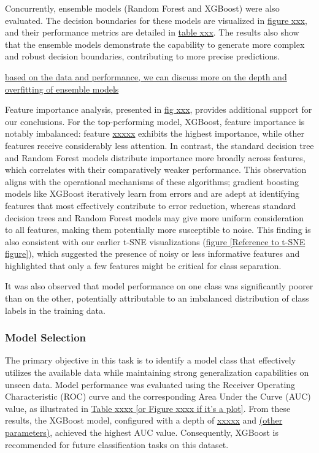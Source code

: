 \documentclass{article}
\begin{document}


Concurrently, ensemble models (Random Forest and XGBoost) were also evaluated. The decision boundaries for these models are visualized in \underline{figure xxx}, and their performance metrics are detailed in \underline{table xxx}. The results also show that the ensemble models demonstrate the capability to generate more complex and robust decision boundaries, contributing to more precise predictions. 

\underline{based on the data and performance, we can discuss more on the depth and overfitting of ensemble models}



Feature importance analysis, presented in \underline{fig xxx}, provides additional support for our conclusions. For the top-performing model, XGBoost, feature importance is notably imbalanced: feature \underline{xxxxx} exhibits the highest importance, while other features receive considerably less attention. In contrast, the standard decision tree and Random Forest models distribute importance more broadly across features, which correlates with their comparatively weaker performance. This observation aligns with the operational mechanisms of these algorithms; gradient boosting models like XGBoost iteratively learn from errors and are adept at identifying features that most effectively contribute to error reduction, whereas standard decision trees and Random Forest models may give more uniform consideration to all features, making them potentially more susceptible to noise. This finding is also consistent with our earlier t-SNE visualizations (\underline{figure [Reference to t-SNE figure]}), which suggested the presence of noisy or less informative features and highlighted that only a few features might be critical for class separation.

It was also observed that model performance on one class was significantly poorer than on the other, potentially attributable to an imbalanced distribution of class labels in the training data.

\subsubsection*{Model Selection}



The primary objective in this task is to identify a model class that effectively utilizes the available data while maintaining strong generalization capabilities on unseen data. Model performance was evaluated using the Receiver Operating Characteristic (ROC) curve and the corresponding Area Under the Curve (AUC) value, as illustrated in \underline{Table xxxx [or Figure xxxx if it's a plot]}. From these results, the XGBoost model, configured with a depth of \underline{xxxxx} and \underline{(other parameters)}, achieved the highest AUC value. Consequently, XGBoost is recommended for future classification tasks on this dataset.
\end{document}
